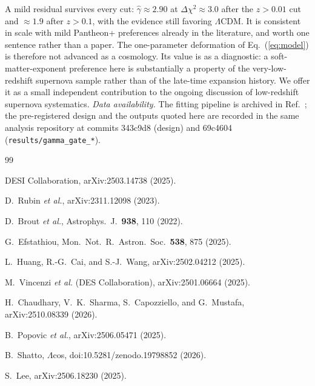 \documentclass[
  aps,
  prd,
  reprint,           %
  nofootinbib,
  longbibliography
]{revtex4-2}
\begin{document}
A mild residual survives every cut: $\hat\gamma \approx 2.90$ at
$\Delta\chi^2 \approx 3.0$ after the $z > 0.01$ cut and $\approx 1.9$
after $z > 0.1$, with the evidence still favoring $\Lambda$CDM. It is
consistent in scale with mild Pantheon+ preferences already in the
literature, and worth one sentence rather than a paper. The
one-parameter deformation of Eq.~(\ref{eq:model}) is therefore not
advanced as a cosmology. Its value is as a diagnostic: a
soft-matter-exponent preference here is substantially a property of the
very-low-redshift supernova sample rather than of the late-time expansion
history. We offer it as a small
independent contribution to the ongoing discussion of low-redshift
supernova systematics. \emph{Data availability.} The fitting pipeline is
archived in Ref.~\cite{Pipeline}; the pre-registered design and the
outputs quoted here are recorded in the same analysis repository at
commits 343c9d8 (design) and 69c4604 (\texttt{results/gamma\_gate\_*}).

\begin{thebibliography}{99}

DESI Collaboration, arXiv:2503.14738 (2025).

D.~Rubin \textit{et al.},
arXiv:2311.12098 (2023).

D.~Brout \textit{et al.},
Astrophys.\ J.\ \textbf{938}, 110 (2022).

G.~Efstathiou,
Mon.\ Not.\ R.\ Astron.\ Soc.\ \textbf{538}, 875 (2025).

L.~Huang, R.-G.~Cai, and S.-J.~Wang,
arXiv:2502.04212 (2025).

M.~Vincenzi \textit{et al.} (DES Collaboration),
arXiv:2501.06664 (2025).

H.~Chaudhary, V.~K.~Sharma, S.~Capozziello, and G.~Mustafa,
arXiv:2510.08339 (2026).

B.~Popovic \textit{et al.},
arXiv:2506.05471 (2025).

B.~Shatto, $\Lambda$cos, doi:10.5281/zenodo.19798852 (2026).

S.~Lee,
arXiv:2506.18230 (2025).

\end{thebibliography}
\end{document}
